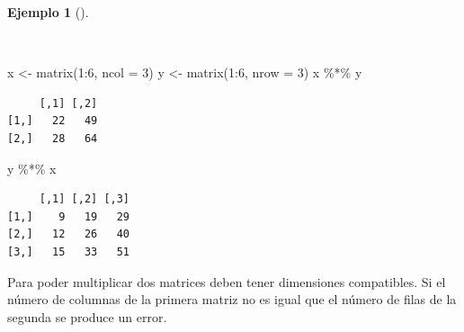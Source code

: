 \documentclass[
  a4paper,
]{scrreport}
\newenvironment{Shaded}{\begin{snugshade}}{\end{snugshade}}
\newcommand{\AttributeTok}[1]{\textcolor[rgb]{0.40,0.45,0.13}{#1}}
\newcommand{\DecValTok}[1]{\textcolor[rgb]{0.68,0.00,0.00}{#1}}
\newcommand{\FunctionTok}[1]{\textcolor[rgb]{0.28,0.35,0.67}{#1}}
\newcommand{\NormalTok}[1]{\textcolor[rgb]{0.00,0.23,0.31}{#1}}
\newcommand{\OtherTok}[1]{\textcolor[rgb]{0.00,0.23,0.31}{#1}}
\newcommand{\SpecialCharTok}[1]{\textcolor[rgb]{0.37,0.37,0.37}{#1}}
\theoremstyle{definition}
\theoremstyle{definition}
\newtheorem{example}{Ejemplo}[chapter]
\theoremstyle{remark}
\begin{document}
\begin{example}[]\protect\hypertarget{exm-producto-matrices}{}\label{exm-producto-matrices}

~

\begin{Shaded}
\begin{Highlighting}[]
\NormalTok{x }\OtherTok{\textless{}{-}} \FunctionTok{matrix}\NormalTok{(}\DecValTok{1}\SpecialCharTok{:}\DecValTok{6}\NormalTok{, }\AttributeTok{ncol =} \DecValTok{3}\NormalTok{)}
\NormalTok{y }\OtherTok{\textless{}{-}} \FunctionTok{matrix}\NormalTok{(}\DecValTok{1}\SpecialCharTok{:}\DecValTok{6}\NormalTok{, }\AttributeTok{nrow =} \DecValTok{3}\NormalTok{)}
\NormalTok{x }\SpecialCharTok{\%*\%}\NormalTok{ y}
\end{Highlighting}
\end{Shaded}

\begin{verbatim}
     [,1] [,2]
[1,]   22   49
[2,]   28   64
\end{verbatim}

\begin{Shaded}
\begin{Highlighting}[]
\NormalTok{y }\SpecialCharTok{\%*\%}\NormalTok{ x}
\end{Highlighting}
\end{Shaded}

\begin{verbatim}
     [,1] [,2] [,3]
[1,]    9   19   29
[2,]   12   26   40
[3,]   15   33   51
\end{verbatim}

\end{example}

\begin{tcolorbox}[enhanced jigsaw, colbacktitle=quarto-callout-warning-color!10!white, breakable, opacitybacktitle=0.6, left=2mm, opacityback=0, leftrule=.75mm, colframe=quarto-callout-warning-color-frame, bottomrule=.15mm, toprule=.15mm, toptitle=1mm, colback=white, titlerule=0mm, title=\textcolor{quarto-callout-warning-color}{\faExclamationTriangle}\hspace{0.5em}{Advertencia}, rightrule=.15mm, arc=.35mm, bottomtitle=1mm, coltitle=black]

Para poder multiplicar dos matrices deben tener dimensiones compatibles.
Si el número de columnas de la primera matriz no es igual que el número
de filas de la segunda se produce un error.

\end{tcolorbox}
\end{document}
